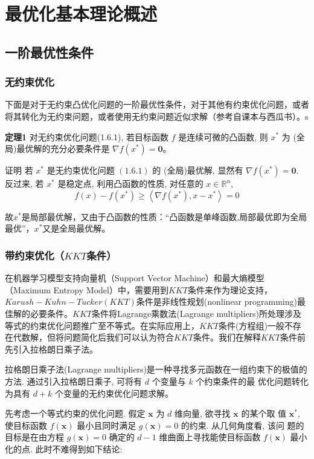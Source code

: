 \chapter{最优化基本理论概述}
\section{一阶最优性条件}
\subsection{无约束优化}
\cite{王宜举2016非线性最优化理论与方法}下面是对于无约束凸优化问题的一阶最优性条件，对于其他有约束优化问题，或者将其转化为无约束问题，或者使用无约束问题近似求解（参考自课本与西瓜书）。s

\textbf{定理1} 对无约束优化问题(1.6.1), 若目标函数 $f$ 是连续可微的凸函数, 则 $x^{*}$ 为 (全局)最优解的充分必要条件是 $\nabla f\left(x^{*}\right)=\mathbf{0}$。

证明 若 $x^{*}$ 是无约束优化问题 $(1.6 .1)$ 的 (全局)最优解, 显然有 $\nabla f\left(x^{*}\right)=\mathbf{0}$. 反过来, 若 $x^{*}$ 是稳定点, 利用凸函数的性质, 对任意的 $x \in \mathbb{R}^{n}$,
$$
f(x)-f\left(x^{*}\right) \geqslant\left\langle\nabla f\left(x^{*}\right), x-x^{*}\right\rangle=0
$$

故$x^{*}$是局部最优解，又由于凸函数的性质：“凸函数是单峰函数,局部最优即为全局最优”，$x^{*}$又是全局最优解。
\subsection{带约束优化（$KKT$条件）}
在机器学习模型支持向量机（Support Vector Machine）和最大熵模型（Maximum Entropy Model）中，需要用到$KKT$条件来作为理论支持，$Karush-Kuhn-Tucker (KKT)$条件是非线性规划(nonlinear programming)最佳解的必要条件。$KKT$条件将Lagrange乘数法(Lagrange multipliers)所处理涉及等式的约束优化问题推广至不等式。在实际应用上，$KKT$条件(方程组)一般不存在代数解，但将问题简化后我们可以认为符合$KKT$条件。我们在解释$KKT$条件前先引入拉格朗日乘子法。

拉格朗日乘子法(Lagrange multipliers)是一种寻找多元函数在一组约束下的极值的方法. 通过引入拉格朗日乘子, 可将有 $d$ 个变量与 $k$ 个约束条件的最 优化问题转化为具有 $d+k$ 个变量的无约束优化问题求解。

先考虑一个等式约束的优化问题. 假定 $\boldsymbol{x}$ 为 $d$ 维向量, 欲寻找 $\boldsymbol{x}$ 的某个取 值 $\boldsymbol{x}^{*}$, 使目标函数 $f(\boldsymbol{x})$ 最小且同时满足 $g(\boldsymbol{x})=0$ 的约束. 从几何角度看, 该问 题的目标是在由方程 $g(\boldsymbol{x})=0$ 确定的 $d-1$ 维曲面上寻找能使目标函数 $f(\boldsymbol{x})$ 最小化的点. 此时不难得到如下结论:

